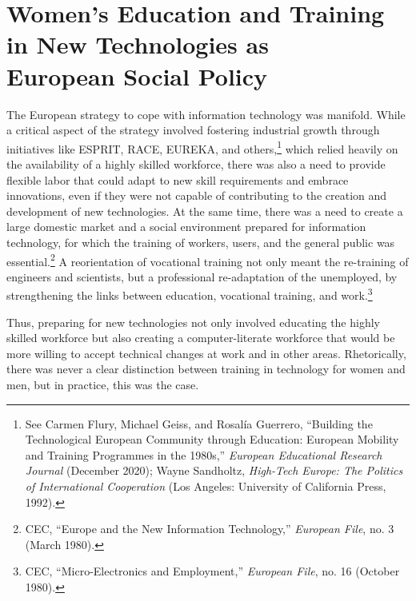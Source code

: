 \documentclass{tufte-handout}
\begin{document}
\hypertarget{womens-education-and-training-in-new-technologies-as-european-social-policy}{%
\section{Women's Education and Training in New Technologies as\\\noindent
European Social
Policy}\label{womens-education-and-training-in-new-technologies-as-european-social-policy}}

The European strategy to cope with information technology was manifold.
While a critical aspect of the strategy involved fostering industrial
growth through initiatives like ESPRIT, RACE, EUREKA, and
others,\footnote{See Carmen Flury, Michael Geiss, and Rosalía Guerrero,
  ``Building the Technological European Community through Education:
  European Mobility and Training Programmes in the 1980s,''
  \emph{European Educational Research Journal} (December 2020); Wayne
  Sandholtz, \emph{High-Tech Europe: The Politics of International
  Cooperation} (Los Angeles: University of California Press, 1992).}
which relied heavily on the availability of a highly skilled workforce,
there was also a need to provide flexible labor that could adapt to new
skill requirements and embrace innovations, even if they were not
capable of contributing to the creation and development of new
technologies. At the same time, there was a need to create a large
domestic market and a social environment prepared for information
technology, for which the training of workers, users, and the general
public was essential.\footnote{CEC, ``Europe and the New Information
  Technology,'' \emph{European File}, no. 3 (March 1980).} A
reorientation of vocational training not only meant the re-training of
engineers and scientists, but a professional re-adaptation of the
unemployed, by strengthening the links between education, vocational
training, and work.\footnote{CEC, ``Micro-Electronics and Employment,''
  \emph{European File}, no. 16 (October 1980).}

Thus, preparing for new technologies not only involved educating the
highly skilled workforce but also creating a computer-literate workforce
that would be more willing to accept technical changes at work and in
other areas. Rhetorically, there was never a clear distinction between
training in technology for women and men, but in practice, this was the
case.
\end{document}
